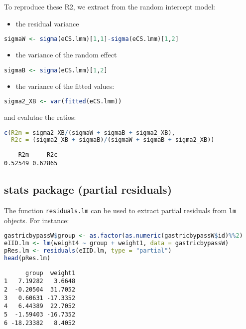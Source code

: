 \documentclass[12pt]{article}
\begin{document}
To reproduce these R2, we extract from the random intercept model:
\begin{itemize}
\item the residual variance
\end{itemize}
\begin{lstlisting}[language=r,numbers=none]
sigmaW <- sigma(eCS.lmm)[1,1]-sigma(eCS.lmm)[1,2]
\end{lstlisting}

\begin{itemize}
\item the variance of the random effect
\end{itemize}
\begin{lstlisting}[language=r,numbers=none]
sigmaB <- sigma(eCS.lmm)[1,2]
\end{lstlisting}

\begin{itemize}
\item the variance of the fitted values:
\end{itemize}
\begin{lstlisting}[language=r,numbers=none]
sigma2_XB <- var(fitted(eCS.lmm))
\end{lstlisting}

and evalutae the ratios:
\begin{lstlisting}[language=r,numbers=none]
c(R2m = sigma2_XB/(sigmaW + sigmaB + sigma2_XB),
  R2c = (sigma2_XB + sigmaB)/(sigmaW + sigmaB + sigma2_XB))
\end{lstlisting}

\label{}
\begin{verbatim}
    R2m     R2c 
0.52549 0.62865
\end{verbatim}
\subsection{stats package (partial residuals)}
\label{sec:org04b0c43}

The function \texttt{residuals.lm} can be used to extract partial residuals
from \texttt{lm} objects. For instance:
\begin{lstlisting}[language=r,numbers=none]
gastricbypassW$group <- as.factor(as.numeric(gastricbypassW$id)%%2)
eIID.lm <- lm(weight4 ~ group + weight1, data = gastricbypassW)
pRes.lm <- residuals(eIID.lm, type = "partial")
head(pRes.lm)
\end{lstlisting}

\label{}
\begin{verbatim}
      group  weight1
1   7.19282   3.6648
2  -0.20504  31.7052
3   0.60631 -17.3352
4   6.44389  22.7052
5  -1.59403 -16.7352
6 -18.23382   8.4052
\end{verbatim}
\end{document}
